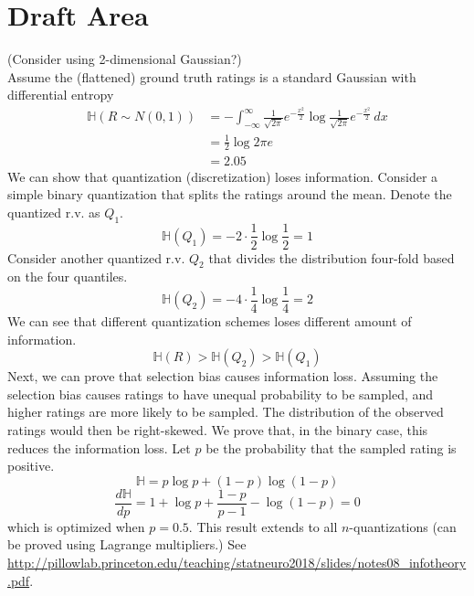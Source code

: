 \documentclass[12pt, letterpaper]{article}
\theoremstyle{definition}\newtheorem*{definition}{Definition}
\theoremstyle{definition}\newtheorem*{example}{Example}
\theoremstyle{definition}\newtheorem*{remark}{Remark}
\def\HH{\mathbb{H}}
\begin{document}
\section{Draft Area}
 (Consider using 2-dimensional Gaussian?)\\
Assume the (flattened) ground truth ratings is a standard Gaussian with differential entropy
\begin{align*} \HH(R\sim N(0, 1)) & = -\int_{-\infty}^\infty \frac{1}{\sqrt{2\pi}}e^{-\frac{x^2}{2}} \log \frac{1}{\sqrt{2\pi}}e^{-\frac{x^2}{2}} \, dx \\
                                  & = \frac{1}{2}\log 2\pi e                                                                                            \\
                                  & = 2.05
\end{align*}
We can show that quantization (discretization) loses information. Consider
a simple binary quantization that splits the ratings around the mean. Denote the quantized r.v. as $Q_1$.
\[ \HH(Q_1) = -2 \cdot \frac{1}{2} \log \frac{1}{2} = 1 \]
Consider another quantized r.v. $Q_2$ that divides the distribution four-fold based on the four quantiles.
\[ \HH(Q_2) = -4 \cdot \frac{1}{4} \log \frac{1}{4} = 2 \]
We can see that different quantization schemes loses different amount of information.
\[ \HH(R) > \HH(Q_2) > \HH(Q_1) \]
Next, we can prove that selection bias causes information loss. Assuming the selection bias causes ratings to have unequal probability to be sampled, and higher ratings are more likely to be sampled. The distribution of the observed ratings would then be right-skewed. We prove that, in the binary case, this reduces the information loss. Let $p$ be the probability that the sampled rating is positive.
\[\HH = p\log p + (1-p) \log (1-p) \]
\[ \frac{d\HH}{dp} = 1 + \log p + \frac{1-p}{p-1} - \log(1-p) = 0 \]
which is optimized when $p = 0.5$. This result extends to all $n$-quantizations (can be proved using Lagrange multipliers.) See \url{http://pillowlab.princeton.edu/teaching/statneuro2018/slides/notes08_infotheory.pdf}.
\end{document}
